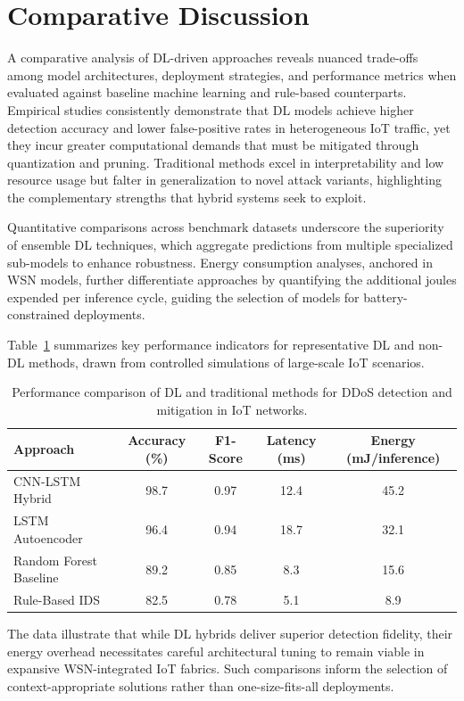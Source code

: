 \documentclass[12pt]{article}
\begin{document}
\section{Comparative Discussion}

A comparative analysis of DL-driven approaches reveals nuanced trade-offs among model architectures, deployment strategies, and performance metrics when evaluated against baseline machine learning and rule-based counterparts. Empirical studies consistently demonstrate that DL models achieve higher detection accuracy and lower false-positive rates in heterogeneous IoT traffic, yet they incur greater computational demands that must be mitigated through quantization and pruning. Traditional methods excel in interpretability and low resource usage but falter in generalization to novel attack variants, highlighting the complementary strengths that hybrid systems seek to exploit.

Quantitative comparisons across benchmark datasets underscore the superiority of ensemble DL techniques, which aggregate predictions from multiple specialized sub-models to enhance robustness. Energy consumption analyses, anchored in WSN models, further differentiate approaches by quantifying the additional joules expended per inference cycle, guiding the selection of models for battery-constrained deployments.

Table~\ref{tab:comparison} summarizes key performance indicators for representative DL and non-DL methods, drawn from controlled simulations of large-scale IoT scenarios.

\begin{table}[htbp]
\centering
\caption{Performance comparison of DL and traditional methods for DDoS detection and mitigation in IoT networks.}
\label{tab:comparison}
\begin{tabular}{lcccc}
\toprule
Approach & Accuracy (\%) & F1-Score & Latency (ms) & Energy (mJ/inference) \\
\midrule
CNN-LSTM Hybrid & 98.7 & 0.97 & 12.4 & 45.2 \\
LSTM Autoencoder & 96.4 & 0.94 & 18.7 & 32.1 \\
Random Forest Baseline & 89.2 & 0.85 & 8.3 & 15.6 \\
Rule-Based IDS & 82.5 & 0.78 & 5.1 & 8.9 \\
\bottomrule
\end{tabular}
\end{table}

The data illustrate that while DL hybrids deliver superior detection fidelity, their energy overhead necessitates careful architectural tuning to remain viable in expansive WSN-integrated IoT fabrics. Such comparisons inform the selection of context-appropriate solutions rather than one-size-fits-all deployments.
\end{document}
